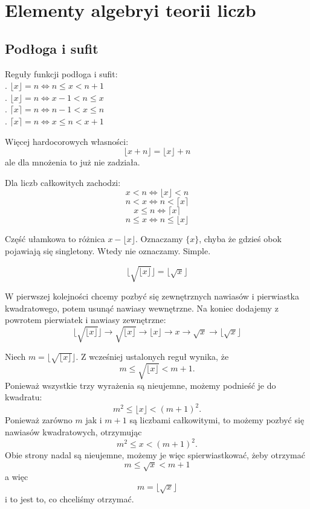 \section{Elementy algebryi teorii liczb}
\subsection{Podłoga i sufit}

Reguły funkcji podłoga i sufit:\smallskip\\
. $\lfloor x\rfloor =n\iff n\leq x< n+1$\\
. $\lfloor x\rfloor = n\iff x-1<n\leq x$\\
. $\lceil x\rceil = n\iff n-1<x\leq n$\\
. $\lceil x\rceil = n\iff x\leq n< x+1$\bigskip

Więcej hardocorowych własności:
$$\lfloor x+n\rfloor = \lfloor x\rfloor+n$$
ale dla mnożenia to już nie zadziała.\medskip

Dla liczb całkowitych zachodzi:
$$x<n\iff \lfloor x\rfloor < n$$
$$n<x\iff n < \lceil x\rceil$$
$$x\leq n\iff \lceil x\rceil$$
$$n\leq x\iff n\leq \lfloor x\rfloor$$

{\color{def}Część ułamkowa} to różnica $x-\lfloor x\rfloor$. Oznaczamy $\{x\}$, chyba że gdzieś obok pojawiają się singletony. Wtedy nie oznaczamy. Simple.


$$\lfloor \sqrt{\lfloor x\rfloor}\rfloor=\lfloor\sqrt{x}\rfloor$$

W pierwszej kolejności chcemy pozbyć się zewnętrznych nawiasów i pierwiastka kwadratowego, potem usunąć nawiasy wewnętrzne. Na koniec dodajemy z powrotem pierwiatek i nawiasy zewnętrzne:
$$\lfloor \sqrt{\lfloor x\rfloor}\rfloor\to \sqrt{\lfloor x\rfloor}\to\lfloor x\rfloor\to x\to \sqrt{x}\to \lfloor \sqrt{x}\rfloor$$

\medskip

Niech $m=\lfloor \sqrt{\lfloor x\rfloor}\rfloor$. Z wcześniej ustalonych reguł wynika, że 
$$m\leq \sqrt{\lfloor x\rfloor} < m+1.$$
Ponieważ wszystkie trzy wyrażenia są nieujemne, możemy podnieść je do kwadratu:
$$m^2\leq \lfloor x\rfloor < (m+1)^2.$$
Ponieważ zarówno $m$ jak i $m+1$ są liczbami całkowitymi, to możemy pozbyć się nawiasów kwadratowych, otrzymując
$$m^2\leq x < (m+1)^2.$$
Obie strony nadal są nieujemne, możemy je więc spierwiastkować, żeby otrzymać
$$m\leq \sqrt{x}<m+1$$
a więc
$$m=\lfloor \sqrt{x}\rfloor$$
i to jest to, co chceliśmy otrzymać.
\kdowod

